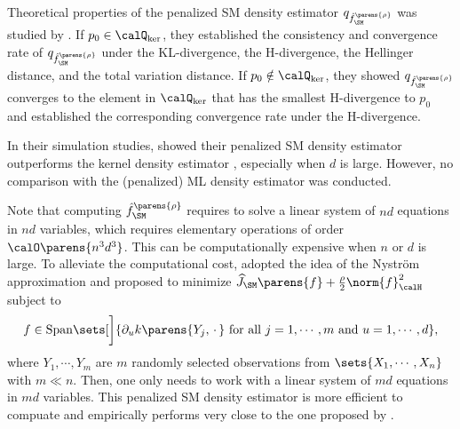 \documentclass[12pt]{article}
\theoremstyle{definition}
\theoremstyle{theorem}
\theoremstyle{remark}
\begin{document}
Theoretical properties of the penalized SM density estimator $q_{\hat{f}_{\SM}^{\parens{\rho}}}$ was studied by \textcites{Sriperumbudur-density-estimation-inf-exp-family}. If $p_0 \in \calQ_{\ker}$, they established the consistency and convergence rate of $q_{\hat{f}_{\SM}^{\parens{\rho}}}$ under the KL-divergence, the H-divergence, the Hellinger distance, and the total variation distance. 
If $p_0 \notin \calQ_{\ker}$, they showed $q_{\hat{f}_{\SM}^{\parens{\rho}}}$ converges to the element in $\calQ_{\ker}$ that has the smallest H-divergence to $p_0$ and established the corresponding convergence rate under the H-divergence. 

In their simulation studies, \textcite{Sriperumbudur-density-estimation-inf-exp-family} showed their penalized SM density estimator outperforms the kernel density estimator \parencites[Section 6.3 in][]{Wasserman2006-lj}, especially when $d$ is large. However, no comparison with the (penalized) ML density estimator was conducted. 

Note that computing $\hat{f}_{\SM}^{\parens{\rho}}$ requires to solve a linear system of $nd$ equations in $nd$ variables, which requires elementary operations of order $\calO \parens{n^3 d^3}$. This can be computationally expensive when $n$ or $d$ is large. To alleviate the computational cost, \textcite{Sutherland2017-wz} adopted the idea of the Nystr{\"o}m approximation \parencite{Williams2001-ka} and proposed to minimize $\widehat{J}_{\SM} \parens{f} + \frac{\rho}{2} \norm{f}_{\calH}^2$ subject to 
\begin{align}
	f \in \mathrm{Span} \sets[\bigg]{\partial_u k \parens{Y_j, \,\cdot\,} \text{ for all } j = 1, \cdots, m \text{ and } u = 1, \cdots, d}, 
\end{align}
where 
$Y_1, \cdots, Y_m$ are $m$ randomly selected observations from $\sets{X_1, \cdots, X_n}$ with $m \ll n$. Then, one only needs to work with a linear system of $md$ equations in $md$ variables. This penalized SM density estimator is more efficient to compuate and empirically performs very close to the one proposed by \textcite{Sriperumbudur-density-estimation-inf-exp-family}. 
\end{document}
